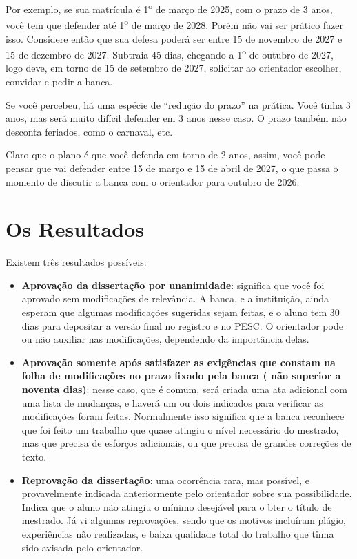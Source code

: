 Por exemplo, se sua matrícula é 1\textsuperscript{o} de março de 2025, com o prazo de 3 anos, você tem que defender até 1\textsuperscript{o} de março de 2028. Porém não vai ser prático fazer isso. Considere então que sua defesa poderá ser entre 15 de novembro de 2027 e 15 de dezembro de 2027. Subtraia 45 dias, chegando a 1\textsuperscript{o} de outubro de 2027, logo deve, em torno de 15 de setembro de 2027, solicitar ao orientador escolher, convidar e pedir a banca.

Se você percebeu, há uma espécie de ``redução do prazo'' na prática. Você tinha 3 anos, mas será muito difícil defender em 3 anos nesse caso. O prazo também não desconta feriados, como o carnaval, etc.

Claro que o plano é que você defenda em torno de 2 anos, assim, você pode pensar que vai defender entre 15 de março e 15 de abril de 2027, o que passa o momento de discutir a banca com o orientador para outubro de 2026.



\section{Os Resultados}

Existem três resultados possíveis:
\begin{itemize}
    \item \textbf{Aprovação da dissertação por unanimidade}: significa que você foi aprovado sem modificações de relevância. A banca, e a instituição, ainda esperam que algumas modificações sugeridas sejam feitas, e o aluno tem 30 dias para depositar a versão final no registro e no PESC. O orientador pode ou não auxiliar nas modificações, dependendo da importância delas.
    \item \textbf{Aprovação  somente  após  satisfazer  as  exigências que constam 	 na  folha  de   modificações  no  prazo   fixado  pela  banca    ( não superior  a   noventa   dias)}: nesse caso, que é comum, será criada uma ata adicional com uma lista de mudanças, e haverá um ou dois indicados para verificar as modificações foram feitas. Normalmente isso significa que a banca reconhece que foi feito um trabalho que quase atingiu o nível necessário do mestrado, mas que precisa de esforços adicionais, ou que precisa de grandes correções de texto.
    \item \textbf{Reprovação da dissertação}: uma ocorrência rara, mas possível, e provavelmente indicada anteriormente pelo orientador sobre sua possibilidade. Indica que o aluno não atingiu o mínimo desejável para o bter o título de mestrado. Já vi algumas reprovações, sendo que os motivos incluíram plágio, experiências não realizadas, e baixa qualidade total do trabalho que tinha sido avisada pelo orientador.
\end{itemize}


